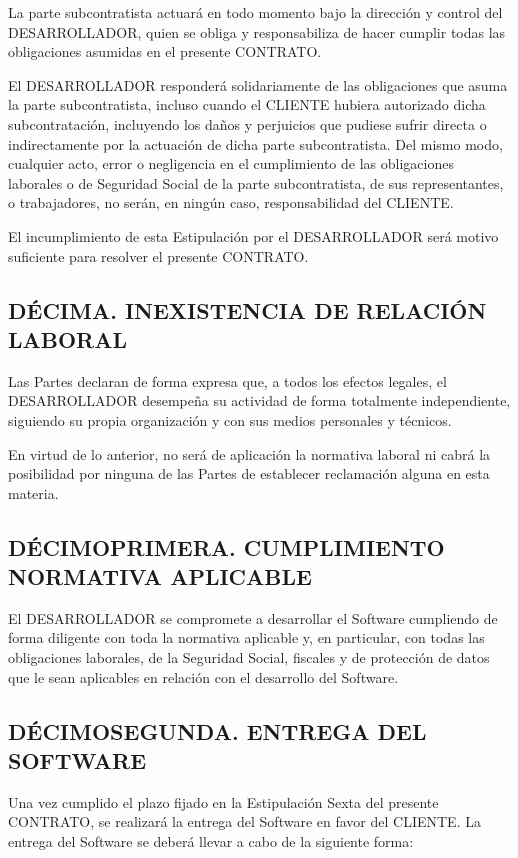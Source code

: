 \documentclass[a4paper,11pt]{report}
\begin{document}
	La parte subcontratista actuará en todo momento bajo la dirección y
	control del DESARROLLADOR, quien se obliga y responsabiliza de hacer
	cumplir todas las obligaciones asumidas en el presente CONTRATO.

	El DESARROLLADOR responderá solidariamente de las obligaciones que asuma
	la parte subcontratista, incluso cuando el CLIENTE hubiera autorizado
	dicha subcontratación, incluyendo los daños y perjuicios que pudiese
	sufrir directa o indirectamente por la actuación de dicha parte
	subcontratista. Del mismo modo, cualquier acto, error o negligencia en
	el cumplimiento de las obligaciones laborales o de Seguridad Social de
	la parte subcontratista, de sus representantes, o trabajadores, no
	serán, en ningún caso, responsabilidad del CLIENTE.

	El incumplimiento de esta Estipulación por el DESARROLLADOR será motivo
	suficiente para resolver el presente CONTRATO.

	\subsection*{DÉCIMA. INEXISTENCIA DE RELACIÓN LABORAL}

	Las Partes declaran de forma expresa que, a todos los efectos legales,
	el DESARROLLADOR desempeña su actividad de forma totalmente
	independiente, siguiendo su propia organización y con sus medios
	personales y técnicos.

	En virtud de lo anterior, no será de aplicación la normativa laboral ni
	cabrá la posibilidad por ninguna de las Partes de establecer reclamación
	alguna en esta materia.

	\subsection*{DÉCIMOPRIMERA. CUMPLIMIENTO NORMATIVA APLICABLE}

	El DESARROLLADOR se compromete a desarrollar el Software cumpliendo de
	forma diligente con toda la normativa aplicable y, en particular, con
	todas las obligaciones laborales, de la Seguridad Social, fiscales y de
	protección de datos que le sean aplicables en relación con el desarrollo
	del Software.

	\subsection*{DÉCIMOSEGUNDA. ENTREGA DEL SOFTWARE}

	Una vez cumplido el plazo fijado en la Estipulación Sexta del presente
	CONTRATO, se realizará la entrega del Software en favor del CLIENTE. La
	entrega del Software se deberá llevar a cabo de la siguiente forma:
\end{document}
